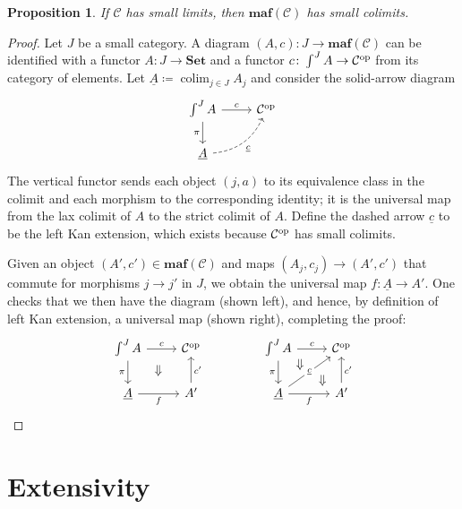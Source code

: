 \documentclass[11pt, one side, article]{memoir}
\theoremstyle{definition}
\theoremstyle{plain}
\newtheorem{proposition}[definitionx]{Proposition}
\DeclareMathOperator*{\colim}{colim}
\newcommand{\cat}[1]{\mathcal{#1}}%
\newcommand{\Cat}[1]{\mathbf{#1}}%
\newcommand{\op}{^\tn{op}}
\newcommand{\tn}[1]{\textnormal{#1}}
\newcommand{\ul}[1]{\underline{#1}}
\newcommand{\smset}{\Cat{Set}}
\newcommand{\0}{\Cat{0}}
\newcommand{\1}{\Cat{1}}
\newcommand{\opfam}{\Cat{maf}}
\begin{document}
\begin{proposition}\label{prop.limits_to_colimits}
If $\cat{C}$ has small limits, then $\opfam(\cat{C})$ has small colimits.
\end{proposition}
\begin{proof}
Let $J$ be a small category. A diagram $(A,c)\colon J\to \opfam(\cat{C})$ can be identified with a functor $A\colon J\to \smset$ and a functor $c\colon \int^JA\to\cat{C}\op$ from its category of elements. Let $\ul{A}\coloneqq\colim_{j\in J}A_j$ and consider the solid-arrow diagram
\[
\begin{tikzcd}
	\int^JA\ar[r, "c"]\ar[d, "\pi"']&
	\cat{C}\op\\
	\ul{A}\ar[ur, bend right, dashed, "\ul{c}"']
\end{tikzcd}
\]
The vertical functor sends each object $(j,a)$ to its equivalence class in the colimit and each morphism to the corresponding identity; it is the universal map from the lax colimit of $A$ to the strict colimit of $A$. Define the dashed arrow $\ul{c}$ to be the left Kan extension, which exists because $\cat{C}\op$ has small colimits.

Given an object $(A',c')\in\opfam(\cat{C})$ and maps $(A_j,c_j)\to(A',c')$ that commute for morphisms $j\to j'$ in $J$, we obtain the universal map $f\colon\ul{A}\to A'$. One checks that we then have the diagram (shown left), and hence, by definition of left Kan extension, a universal map (shown right), completing the proof:
\[
\begin{tikzcd}
	\int^JA\ar[r, "c"]\ar[d, "\pi"']&
	\cat{C}\op\\
	\ul{A}\ar[r, "f"']&A'\ar[u, "c'"']\ar[ul, phantom, pos=.6, "\Downarrow"]
\end{tikzcd}
\hspace{.6in}
\begin{tikzcd}
	\int^JA\ar[r, "c"]\ar[d, "\pi"']&
	\cat{C}\op\\
	\ul{A}\ar[r, "f"']\ar[ur, "\ul{c}" description]&A'\ar[u, "c'"']
	\ar[ul, phantom, pos=.2, "\Downarrow"]\ar[ul, phantom, pos=.85, "\Downarrow"]
\end{tikzcd}
\qedhere
\]
\end{proof}

\section{Extensivity}
\end{document}
